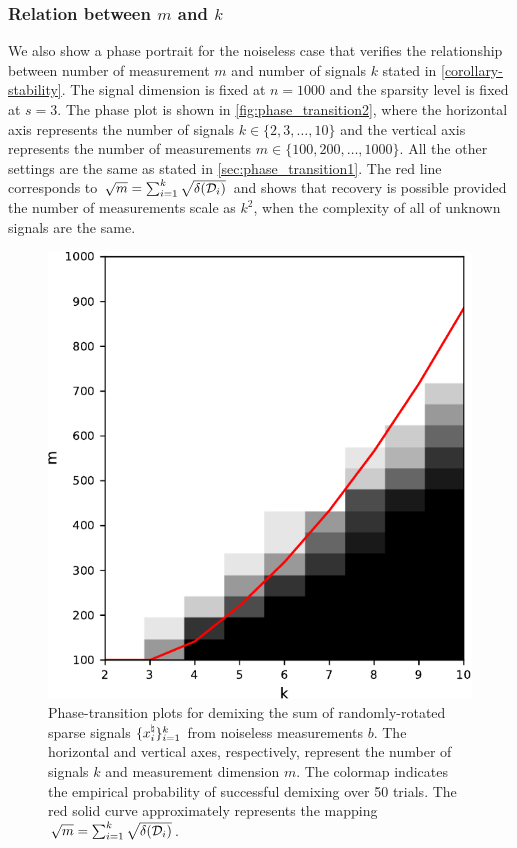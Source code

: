 \subsubsection{Relation between $m$ and $k$}
We also show a phase portrait for the noiseless case that verifies the relationship between number of measurement $m$ and number of signals $k$ stated in \autoref{corollary-stability}. The signal dimension is fixed at $n=1000$ and the sparsity level is fixed at $s=3$. The phase plot is shown in \autoref{fig:phase_transition2}, where the horizontal axis represents the number of signals $k\in\{2, 3, \dots, 10\}$ and the vertical axis represents the number of measurements $m\in\{100, 200, \dots, 1000\}$. All the other settings are the same as stated in \autoref{sec:phase_transition1}. The red line corresponds to $\sqrt{m} = \sum_{i=1}^k \sqrt{\delta(\mathcal{D}_i)}$ and shows that recovery is possible provided the number of measurements scale as $k^2$, when the complexity of all of unknown signals are the same.

\begin{figure}[t]
    \centering\small
    \includegraphics[width=.5\linewidth]{./figures/relation_m_k.pdf}
    \caption{Phase-transition plots for demixing the sum of randomly-rotated sparse signals $\{x_i^{\natural}\}_{i=1}^k$ from noiseless measurements $b$. The horizontal and vertical axes, respectively, represent the number of signals $k$ and measurement dimension $m$. The colormap indicates the empirical probability of successful demixing over 50 trials. The red solid curve approximately represents the mapping $\sqrt{m} = \sum_{i=1}^k \sqrt{\delta(\mathcal{D}_i)}$.}
    \label{fig:phase_transition2}
\end{figure}

